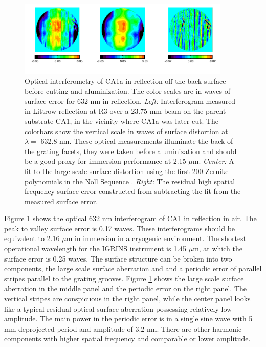 \begin{figure}
  \centering
\includegraphics[width=0.9\textwidth]{chSPIE_2012_CA1/figs/CA1a_fig_scl2}
  \caption[Optical interferometry of the IGRINS immersion grating]{Optical interferometry of CA1a in reflection off the back surface before cutting and aluminization.  The color scales are in waves of surface error for 632 nm in reflection.  \emph{Left:} Interferogram measured in Littrow reflection at R3 over a 23.75 mm beam on the parent substrate CA1, in the vicinity where CA1a was later cut.  The colorbars show the vertical scale in waves of surface distortion at $\lambda = $ 632.8 nm.  These optical measurements illuminate the back of the grating facets, they were taken before aluminization and should be a good proxy for immersion performance at 2.15 $\mu$m. \emph{Center:} A fit to the large scale surface distortion using the first 200 Zernike polynomials in the Noll Sequence \cite{noll1976}.  \emph{Right:} The residual high spatial frequency surface error constructed from subtracting the fit from the measured surface error.}
  \label{fig:gram}
\end{figure}

Figure \ref{fig:gram} shows the optical 632 nm interferogram of CA1 in reflection in air.  The peak to valley surface error is 0.17 waves.  These interferograms should be equivalent to 2.16 $\mu$m in immersion in a cryogenic environment.  The shortest operational wavelength for the IGRINS instrument is 1.45 $\mu$m, at which the surface error is 0.25 waves.  The surface structure can be broken into two components, the large scale surface aberration and and a periodic error of parallel stripes parallel to the grating grooves.  Figure \ref{fig:gram} shows the large scale surface aberration in the middle panel and the periodic error on the right panel.  The vertical stripes are conspicuous in the right panel, while the center panel looks like a typical residual optical surface aberration possessing relatively low amplitude.  The main power in the periodic error is in a single sine wave with 5 mm deprojected period and amplitude of 3.2 nm.  There are other harmonic components with higher spatial frequency and comparable or lower amplitude.  

